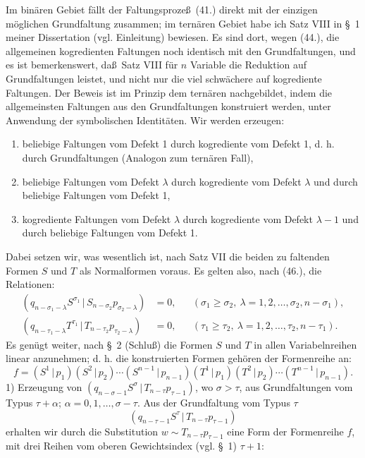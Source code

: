\documentclass[11pt]{article}
\providecommand{\pair}[2]{(#1\,|\,#2)}
\begin{document}
Im bin\"aren Gebiet f\"allt der Faltungsproze\ss\ (41.) direkt mit der einzigen m\"oglichen Grundfaltung zusammen; im tern\"aren Gebiet habe ich Satz VIII in \S\ 1 meiner Dissertation (vgl. Einleitung) bewiesen. Es sind dort, wegen (44.), die allgemeinen kogredienten Faltungen noch identisch mit den Grundfaltungen, und es ist bemerkenswert, da\ss\ Satz VIII f\"ur $n$ Variable die Reduktion auf Grundfaltungen leistet, und nicht nur die viel schw\"achere auf kogrediente Faltungen. Der Beweis ist im Prinzip dem tern\"aren nachgebildet, indem die allgemeinsten Faltungen aus den Grundfaltungen konstruiert werden, unter Anwendung der symbolischen Identit\"aten. Wir werden erzeugen:
\begin{enumerate}
\item beliebige Faltungen vom Defekt 1 durch kogrediente vom Defekt 1, d. h. durch Grundfaltungen (Analogon zum tern\"aren Fall),
\item beliebige Faltungen vom Defekt $\lambda$ durch kogrediente vom Defekt $\lambda$ und durch beliebige Faltungen vom Defekt 1,
\item kogrediente Faltungen vom Defekt $\lambda$ durch kogrediente vom Defekt $\lambda-1$ und durch beliebige Faltungen vom Defekt 1.
\end{enumerate}
Dabei setzen wir, was wesentlich ist, nach Satz VII die beiden zu faltenden Formen $S$ und $T$ als Normalformen voraus. Es gelten also, nach (46.), die Relationen:
\begin{equation}
\begin{aligned}
\pair{q_{n-\sigma_1-\lambda}S^{\sigma_1}}{S_{n-\sigma_2}p_{\sigma_2-\lambda}}&=0,
&& (\sigma_1\ge\sigma_2,\ \lambda=1,2,\ldots,\sigma_2,n-\sigma_1),\\
\pair{q_{n-\tau_1-\lambda}T^{\tau_1}}{T_{n-\tau_2}p_{\tau_2-\lambda}}&=0,
&& (\tau_1\ge\tau_2,\ \lambda=1,2,\ldots,\tau_2,n-\tau_1).
\end{aligned}
\tag{62}
\end{equation}
Es gen\"ugt weiter, nach \S\ 2 (Schlu\ss) die Formen $S$ und $T$ in allen Variabelnreihen linear anzunehmen; d. h. die konstruierten Formen geh\"oren der Formenreihe an:
\[
 f=\pair{S^1}{p_1}\pair{S^2}{p_2}\cdots\pair{S^{n-1}}{p_{n-1}}
   \pair{T^1}{p_1}\pair{T^2}{p_2}\cdots\pair{T^{n-1}}{p_{n-1}}.
\]
1) Erzeugung von $\pair{q_{n-\sigma-1}S^\sigma}{T_{n-\tau}p_{\tau-1}}$, wo $\sigma>\tau$, aus Grundfaltungen vom Typus $\tau+\alpha$; $\alpha=0,1,\ldots,\sigma-\tau$. Aus der Grundfaltung vom Typus $\tau$
\[
 \pair{q_{n-\tau-1}S^\tau}{T_{n-\tau}p_{\tau-1}}
\]
erhalten wir durch die Substitution $w\sim T_{n-\tau}p_{\tau-1}$ eine Form der Formenreihe $f$, mit drei Reihen vom oberen Gewichtsindex (vgl. \S\ 1) $\tau+1$:
\end{document}
